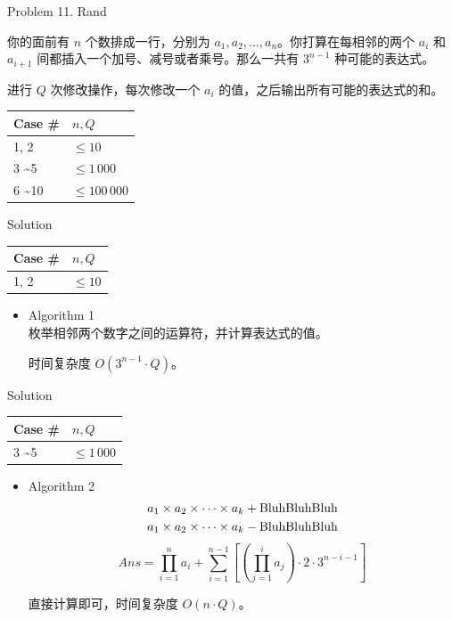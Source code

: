 \documentclass[UTF8]{beamer}
\begin{document}

\begin{frame}{Problem 11. Rand}

你的面前有 $n$ 个数排成一行，分别为 $a_1, a_2, \dots, a_n$。你打算在每相邻的两个
$a_i$ 和 $a_{i+1}$ 间都插入一个加号、减号或者乘号。那么一共有 $3^{n-1}$ 种可能的表达式。

进行 $Q$ 次修改操作，每次修改一个 $a_i$ 的值，之后输出所有可能的表达式的和。

\begin{tabularx}{\textwidth}{X|X} \hline
Case \# & $n, Q$ \\ \hline \hline
1, 2                 & $\leq 10$       \\ \hline
3 \textasciitilde 5  & $\leq 1\,000$   \\ \hline
6 \textasciitilde 10 & $\leq 100\,000$ \\ \hline
\end{tabularx}

\end{frame}

\begin{frame}{Solution}

\begin{tabularx}{\textwidth}{X|X} \hline
Case \# & $n, Q$ \\ \hline \hline
1, 2                 & $\leq 10$       \\ \hline
\end{tabularx}
\begin{itemize}
    \item Algorithm 1 \\
        枚举相邻两个数字之间的运算符，并计算表达式的值。

        时间复杂度 $O(3^{n-1} \cdot Q)$。
\end{itemize}

\end{frame}

\begin{frame}{Solution}

\begin{tabularx}{\textwidth}{X|X} \hline
Case \# & $n, Q$ \\ \hline \hline
3 \textasciitilde 5  & $\leq 1\,000$   \\ \hline
\end{tabularx}
\begin{itemize}
    \item Algorithm 2 \\
        \begin{align*}
            &a_1 \times a_2 \times \dots \times a_k + {\rm Bluh Bluh Bluh} \\
            &a_1 \times a_2 \times \dots \times a_k - {\rm Bluh Bluh Bluh}
        \end{align*}
        \pause
        $$
            Ans = \prod_{i = 1}^{n} a_i + \sum_{i = 1}^{n - 1} \left [\left (\prod_{j = 1}^i a_j \right ) \cdot 2 \cdot 3^{n - i - 1}\right ]
        $$

        直接计算即可，时间复杂度 $O(n \cdot Q)$。
\end{itemize}

\end{frame}
\end{document}
